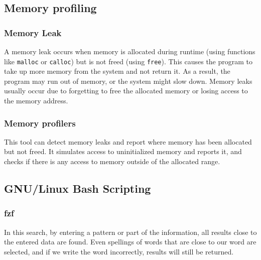 \documentclass{article}
\begin{document}
    \subsection{Memory profiling}
        \subsubsection{Memory Leak}
            A memory leak occurs when memory is allocated during runtime 
            (using functions like \texttt{malloc} or \texttt{calloc}) but is 
            not freed (using \texttt{free}).
             This causes the program to take up more memory from the system 
             and not return it. As a result, the program may run out of memory, 
             or the system might slow 
             down. Memory leaks usually occur due to forgetting to free the 
             allocated memory or losing access to the memory address.


        \subsubsection{Memory profilers}
            This tool can detect memory leaks and report where memory has been 
            allocated but not freed. It simulates access to uninitialized memory
             and reports it, and checks if there is any access to memory outside 
             of the allocated range.


    \subsection{GNU/Linux Bash Scripting}
        \subsubsection{fzf}
            In this search, by entering a pattern or part of the information, all
             results close to the entered data are found. Even spellings of words 
             that are close to our word are selected, and if we write the word incorrectly,
              results will still be returned.
              
\end{document}
